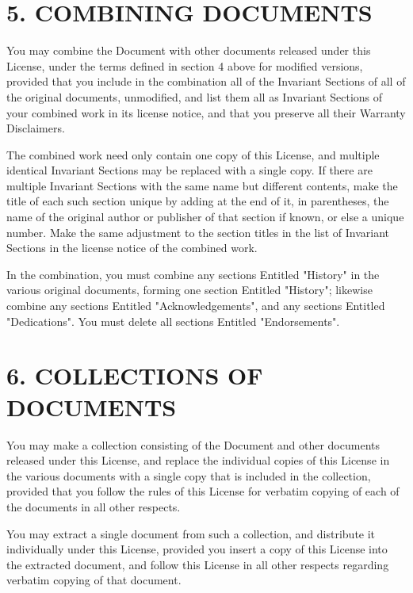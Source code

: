 \section{5. COMBINING DOCUMENTS}
You may combine the Document with other documents released under this License, under the terms defined in section 4 above for modified versions, provided that you include in the combination all of the Invariant Sections of all of the original documents, unmodified, and list them all as Invariant Sections of your combined work in its license notice, and that you preserve all their Warranty Disclaimers.\par
The combined work need only contain one copy of this License, and multiple identical Invariant Sections may be replaced with a single copy. If there are multiple Invariant Sections with the same name but different contents, make the title of each such section unique by adding at the end of it, in parentheses, the name of the original author or publisher of that section if known, or else a unique number. Make the same adjustment to the section titles in the list of Invariant Sections in the license notice of the combined work.\par
In the combination, you must combine any sections Entitled "History" in the various original documents, forming one section Entitled "History"; likewise combine any sections Entitled "Acknowledgements", and any sections Entitled "Dedications". You must delete all sections Entitled "Endorsements".
\section{6. COLLECTIONS OF DOCUMENTS}
You may make a collection consisting of the Document and other documents released under this License, and replace the individual copies of this License in the various documents with a single copy that is included in the collection, provided that you follow the rules of this License for verbatim copying of each of the documents in all other respects.\par
You may extract a single document from such a collection, and distribute it individually under this License, provided you insert a copy of this License into the extracted document, and follow this License in all other respects regarding verbatim copying of that document.
